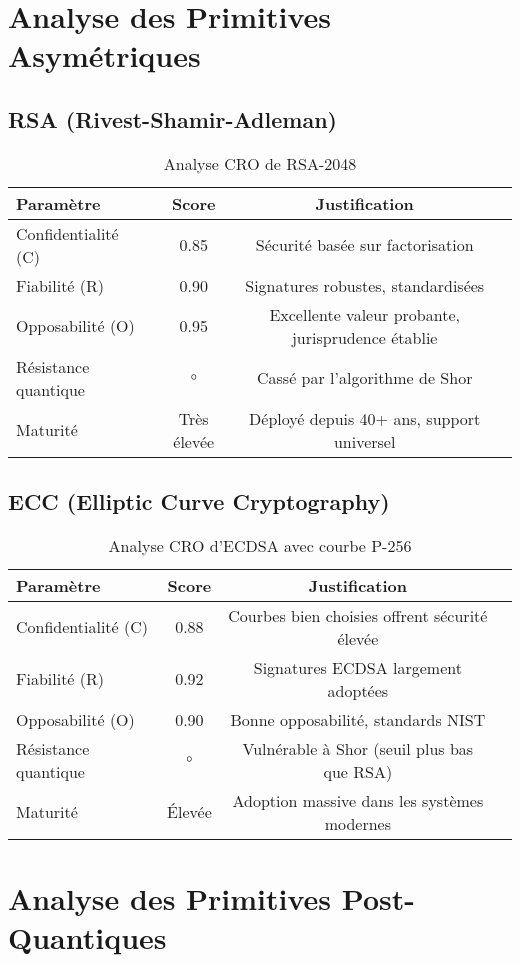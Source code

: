 \section{Analyse des Primitives Asymétriques}
\subsection{RSA (Rivest-Shamir-Adleman)}
\begin{table}[H]
\centering
\begin{tabular}{lccc}
\hline
\textbf{Paramètre} & \textbf{Score} & \textbf{Justification} \\
\hline
Confidentialité (C) & 0.85 & Sécurité basée sur factorisation \\
Fiabilité (R) & 0.90 & Signatures robustes, standardisées \\
Opposabilité (O) & 0.95 & Excellente valeur probante, jurisprudence établie \\
Résistance quantique & \(\circ\) & Cassé par l'algorithme de Shor \\
Maturité & Très élevée & Déployé depuis 40+ ans, support universel \\
\hline
\end{tabular}
\caption{Analyse CRO de RSA-2048}
\end{table}

\subsection{ECC (Elliptic Curve Cryptography)}
\begin{table}[H]
\centering
\begin{tabular}{lccc}
\hline
\textbf{Paramètre} & \textbf{Score} & \textbf{Justification} \\
\hline
Confidentialité (C) & 0.88 & Courbes bien choisies offrent sécurité élevée \\
Fiabilité (R) & 0.92 & Signatures ECDSA largement adoptées \\
Opposabilité (O) & 0.90 & Bonne opposabilité, standards NIST \\
Résistance quantique & \(\circ\) & Vulnérable à Shor (seuil plus bas que RSA) \\
Maturité & Élevée & Adoption massive dans les systèmes modernes \\
\hline
\end{tabular}
\caption{Analyse CRO d'ECDSA avec courbe P-256}
\end{table}

\section{Analyse des Primitives Post-Quantiques}
